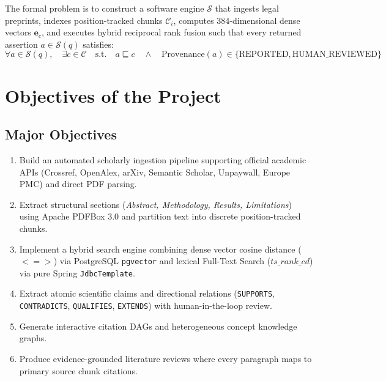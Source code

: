 \documentclass[11pt,a4paper,titlepage]{report}
\begin{document}
The formal problem is to construct a software engine $\mathcal{S}$ that ingests legal preprints, indexes position-tracked chunks $\mathcal{C}_i$, computes 384-dimensional dense vectors $\mathbf{e}_c$, and executes hybrid reciprocal rank fusion such that every returned assertion $a \in \mathcal{S}(q)$ satisfies:
\begin{equation}
\forall a \in \mathcal{S}(q), \quad \exists c \in \mathcal{C} \quad \text{s.t.} \quad a \sqsubseteq c \quad \land \quad \text{Provenance}(a) \in \{\text{REPORTED}, \text{HUMAN\_REVIEWED}\}
\end{equation}

\chapter{Objectives of the Project}

\section{Major Objectives}
\begin{enumerate}[label=\textbf{\arabic*.}]
    \item Build an automated scholarly ingestion pipeline supporting official academic APIs (Crossref, OpenAlex, arXiv, Semantic Scholar, Unpaywall, Europe PMC) and direct PDF parsing.
    \item Extract structural sections (\textit{Abstract, Methodology, Results, Limitations}) using Apache PDFBox 3.0 and partition text into discrete position-tracked chunks.
    \item Implement a hybrid search engine combining dense vector cosine distance ($<=>$) via PostgreSQL \texttt{pgvector} and lexical Full-Text Search ($ts\_rank\_cd$) via pure Spring \texttt{JdbcTemplate}.
    \item Extract atomic scientific claims and directional relations (\texttt{SUPPORTS}, \texttt{CONTRADICTS}, \texttt{QUALIFIES}, \texttt{EXTENDS}) with human-in-the-loop review.
    \item Generate interactive citation DAGs and heterogeneous concept knowledge graphs.
    \item Produce evidence-grounded literature reviews where every paragraph maps to primary source chunk citations.
\end{enumerate}
\end{document}
